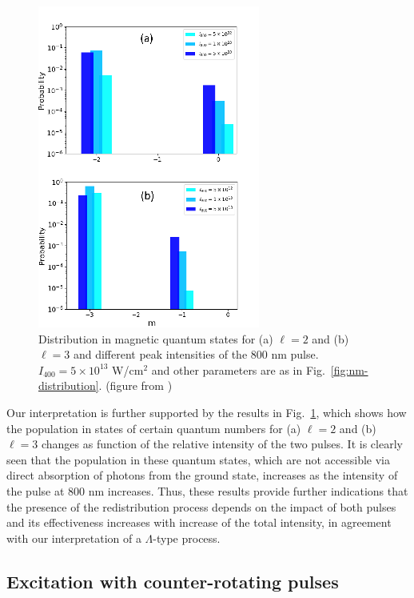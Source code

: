 \begin{figure}[!ht]
\centering
\includegraphics[width=0.5\columnwidth]{figs/Rydberg/Gebre-bicircular-Fig5.png}
\caption{\label{fig:nm-fixedl-distribution}
{
Distribution in magnetic quantum states for (a) $\ell = 2$ and (b) $\ell = 3 $ and different peak intensities of the 800 nm pulse. $I_{400} = 5\times 10^{13}$ W/cm$^2$ and other parameters are as in Fig.~\ref{fig:nm-distribution}. (figure from \cite{venzke2020_ryd})}
}
\end{figure}

Our interpretation is further supported by the results in Fig.~\ref{fig:nm-fixedl-distribution}, which shows how the population in states of certain quantum numbers for (a) $\ell = 2$ and (b) $\ell = 3$ changes as function of the relative intensity of the two pulses. It is clearly seen that the population in these quantum states, which are not accessible via direct absorption of photons from the ground state, increases as the intensity of the pulse at 800 nm increases. Thus, these results provide further indications that the presence of the redistribution process depends on the impact of both pulses and its effectiveness increases with increase of the total intensity, in agreement with our interpretation of a $\Lambda$-type process.

\subsection{Excitation with counter-rotating pulses}


